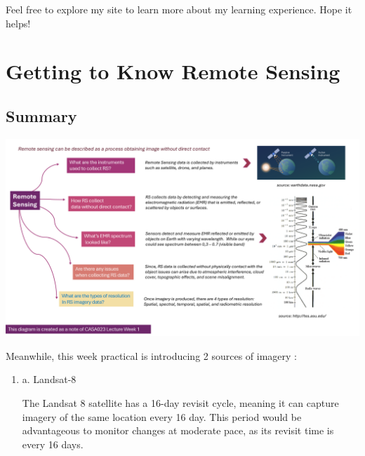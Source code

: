 \documentclass[
  letterpaper,
  DIV=11,
  numbers=noendperiod]{scrreprt}
\begin{document}
Feel free to explore my site to learn more about my learning experience.
Hope it helps!


\hypertarget{getting-to-know-remote-sensing}{%
\chapter{Getting to Know Remote
Sensing}\label{getting-to-know-remote-sensing}}

\hypertarget{summary}{%
\section{\texorpdfstring{\textbf{Summary}}{Summary}}\label{summary}}

\includegraphics{images/clipboard-1084697230.png}

Meanwhile, this week practical is introducing 2 sources of imagery :

\begin{enumerate}
\def\labelenumi{\arabic{enumi}.}
\item
  a. Landsat-8

  The Landsat 8 satellite has a 16-day revisit cycle, meaning it can
  capture imagery of the same location every 16 day. This period would
  be advantageous to monitor changes at moderate pace, as its revisit
  time is every 16 days.
\end{enumerate}
\end{document}
